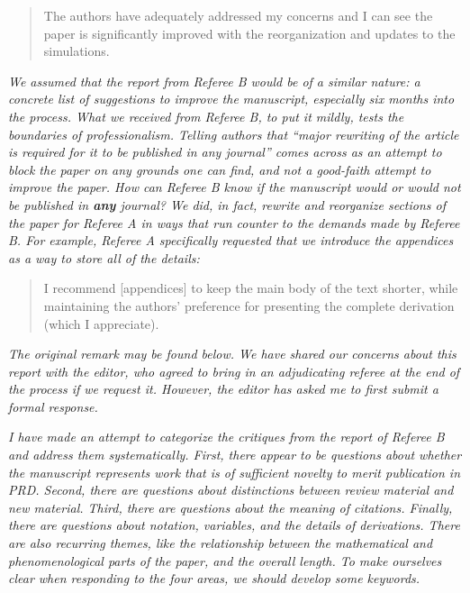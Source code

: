 \documentclass[12pt]{article}
\begin{document}
\begin{quote}
The authors have adequately addressed my concerns and I can see the paper is significantly improved with the reorganization and updates to the simulations.
\end{quote}

\textit{We assumed that the report from Referee B would be of a similar nature: a concrete list of suggestions to improve the manuscript, especially six months into the process.  What we received from Referee B, to put it mildly, tests the boundaries of professionalism.  Telling authors that ``major rewriting of the article is required for it to be published in any journal'' comes across as an attempt to block the paper on any grounds one can find, and not a good-faith attempt to improve the paper.  How can Referee B know if the manuscript would or would not be published in \textbf{any} journal?  We did, in fact, rewrite and reorganize sections of the paper for Referee A in ways that run counter to the demands made by Referee B.  For example, Referee A specifically requested that we introduce the appendices as a way to store all of the details:}

\begin{quote}
I recommend [appendices] to keep the main body of the text shorter, while maintaining the authors’ preference for presenting the complete derivation (which I appreciate).
\end{quote}

\textit{The original remark may be found below.  We have shared our concerns about this report with the editor, who agreed to bring in an adjudicating referee at the end of the process if we request it.  However, the editor has asked me to first submit a formal response.}

\textit{I have made an attempt to categorize the critiques from the report of Referee B and address them systematically.  First, there appear to be questions about whether the manuscript represents work that is of sufficient novelty to merit publication in PRD.  Second, there are questions about distinctions between review material and new material.  Third, there are questions about the meaning of citations.  Finally, there are questions about notation, variables, and the details of derivations.  There are also recurring themes, like the relationship between the mathematical and phenomenological parts of the paper, and the overall length.  To make ourselves clear when responding to the four areas, we should develop some keywords.}
\end{document}
